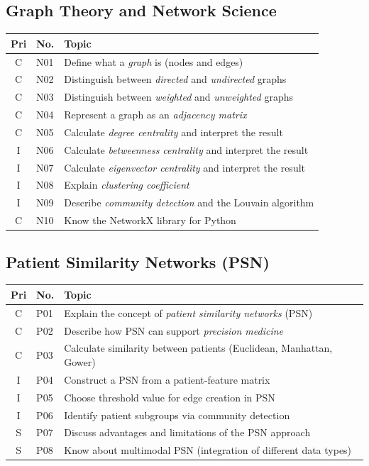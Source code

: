 \documentclass[11pt,a4paper]{article}
\begin{document}
\subsection{Graph Theory and Network Science}

\begin{longtable}{@{}clp{9cm}@{}}
\toprule
\textbf{Pri} & \textbf{No.} & \textbf{Topic} \\
\midrule
\endfirsthead
\midrule
\endhead
\midrule
\endfoot
\bottomrule
\endlastfoot
C & N01 & Define what a \emph{graph} is (nodes and edges) \\
C & N02 & Distinguish between \emph{directed} and \emph{undirected} graphs \\
C & N03 & Distinguish between \emph{weighted} and \emph{unweighted} graphs \\
C & N04 & Represent a graph as an \emph{adjacency matrix} \\
C & N05 & Calculate \emph{degree centrality} and interpret the result \\
I & N06 & Calculate \emph{betweenness centrality} and interpret the result \\
I & N07 & Calculate \emph{eigenvector centrality} and interpret the result \\
I & N08 & Explain \emph{clustering coefficient} \\
I & N09 & Describe \emph{community detection} and the Louvain algorithm \\
C & N10 & Know the NetworkX library for Python \\
\end{longtable}

\subsection{Patient Similarity Networks (PSN)}

\begin{longtable}{@{}clp{9cm}@{}}
\toprule
\textbf{Pri} & \textbf{No.} & \textbf{Topic} \\
\midrule
\endfirsthead
\midrule
\endhead
\midrule
\endfoot
\bottomrule
\endlastfoot
C & P01 & Explain the concept of \emph{patient similarity networks} (PSN) \\
C & P02 & Describe how PSN can support \emph{precision medicine} \\
C & P03 & Calculate similarity between patients (Euclidean, Manhattan, Gower) \\
I & P04 & Construct a PSN from a patient-feature matrix \\
I & P05 & Choose threshold value for edge creation in PSN \\
I & P06 & Identify patient subgroups via community detection \\
S & P07 & Discuss advantages and limitations of the PSN approach \\
S & P08 & Know about multimodal PSN (integration of different data types) \\
\end{longtable}
\end{document}
